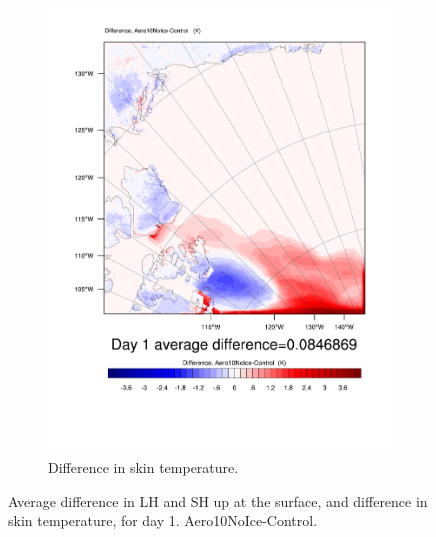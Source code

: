 \begin{figure}
	\begin{subfigure}{0.48\textwidth}
		\includegraphics[width=\textwidth]{results/aero10ni/diff_Aero10NoIce_TSK_Day1.pdf}
		\caption{Difference in skin temperature.}
		\label{subfig:skin_r4Day1}
	\end{subfigure}
	\caption{Average difference in LH and SH up at the surface, and difference in skin temperature, for day 1. Aero10NoIce-Control.}
	\label{fig:lhshskin_r4Day1}
\end{figure}

\clearpage
